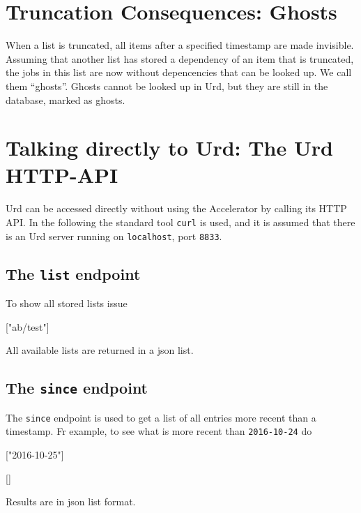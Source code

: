 \section{Truncation Consequences:  Ghosts}
When a list is truncated, all items after a specified timestamp are
made invisible.  Assuming that another list has stored a dependency of
an item that is truncated, the jobs in this list are now without
depencencies that can be looked up.  We call them ``ghosts''.  Ghosts
cannot be looked up in Urd, but they are still in the database, marked
as ghosts.



\clearpage
\section{Talking directly to Urd:  The Urd HTTP-API}

Urd can be accessed directly without using the Accelerator by calling
its HTTP API.  In the following the standard tool \texttt{curl} is
used, and it is assumed that there is an Urd server running
on \texttt{localhost}, port \texttt{8833}.


\subsection{The \texttt{list} endpoint}
To show all stored lists issue
\begin{shell}
["ab/test"]
\end{shell}
All available lists are returned in a json list.


\subsection{The \texttt{since} endpoint}
The \texttt{since} endpoint is used to get a list of all entries more recent than a timestamp.
Fr example, to see what is more recent than \texttt{2016-10-24} do
\begin{shell}
["2016-10-25"]
\end{shell}
\begin{shell}
[]
\end{shell}
Results are in json list format.


